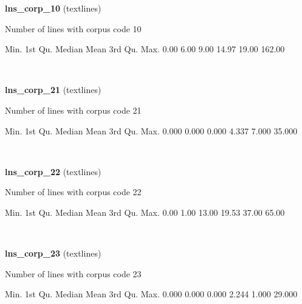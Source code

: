 \documentclass[]{article}
\newenvironment{Shaded}{\begin{snugshade}}{\end{snugshade}}
\newcommand{\FloatTok}[1]{\textcolor[rgb]{0.00,0.00,0.81}{{#1}}}
\newcommand{\NormalTok}[1]{{#1}}
\begin{document}
\textbf{lns\_corp\_10} (textlines)

Number of lines with corpus code 10

\begin{Shaded}
\begin{Highlighting}[]
   \NormalTok{Min. 1st Qu.  Median    Mean 3rd Qu.    Max. }
   \FloatTok{0.00}    \FloatTok{6.00}    \FloatTok{9.00}   \FloatTok{14.97}   \FloatTok{19.00}  \FloatTok{162.00} 
\end{Highlighting}
\end{Shaded}

~

\vspace{1em}

\textbf{lns\_corp\_21} (textlines)

Number of lines with corpus code 21

\begin{Shaded}
\begin{Highlighting}[]
   \NormalTok{Min. 1st Qu.  Median    Mean 3rd Qu.    Max. }
  \FloatTok{0.000}   \FloatTok{0.000}   \FloatTok{0.000}   \FloatTok{4.337}   \FloatTok{7.000}  \FloatTok{35.000} 
\end{Highlighting}
\end{Shaded}

~

\vspace{1em}

\textbf{lns\_corp\_22} (textlines)

Number of lines with corpus code 22

\begin{Shaded}
\begin{Highlighting}[]
   \NormalTok{Min. 1st Qu.  Median    Mean 3rd Qu.    Max. }
   \FloatTok{0.00}    \FloatTok{1.00}   \FloatTok{13.00}   \FloatTok{19.53}   \FloatTok{37.00}   \FloatTok{65.00} 
\end{Highlighting}
\end{Shaded}

~

\vspace{1em}

\textbf{lns\_corp\_23} (textlines)

Number of lines with corpus code 23

\begin{Shaded}
\begin{Highlighting}[]
   \NormalTok{Min. 1st Qu.  Median    Mean 3rd Qu.    Max. }
  \FloatTok{0.000}   \FloatTok{0.000}   \FloatTok{0.000}   \FloatTok{2.244}   \FloatTok{1.000}  \FloatTok{29.000} 
\end{Highlighting}
\end{Shaded}
\end{document}
